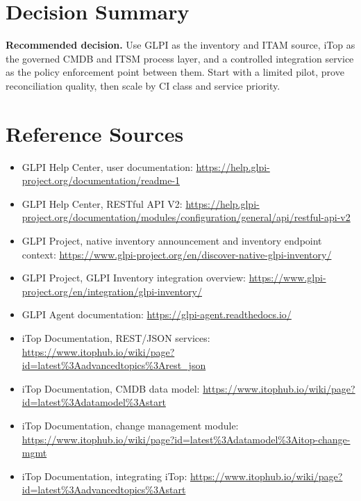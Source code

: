 \documentclass[11pt]{article}
\newcommand{\sourcesection}{%
\section*{Reference Sources}
\small
\begin{itemize}
  \item GLPI Help Center, user documentation: \url{https://help.glpi-project.org/documentation/readme-1}
  \item GLPI Help Center, RESTful API V2: \url{https://help.glpi-project.org/documentation/modules/configuration/general/api/restful-api-v2}
  \item GLPI Project, native inventory announcement and inventory endpoint context: \url{https://www.glpi-project.org/en/discover-native-glpi-inventory/}
  \item GLPI Project, GLPI Inventory integration overview: \url{https://www.glpi-project.org/en/integration/glpi-inventory/}
  \item GLPI Agent documentation: \url{https://glpi-agent.readthedocs.io/}
  \item iTop Documentation, REST/JSON services: \url{https://www.itophub.io/wiki/page?id=latest\%3Aadvancedtopics\%3Arest_json}
  \item iTop Documentation, CMDB data model: \url{https://www.itophub.io/wiki/page?id=latest\%3Adatamodel\%3Astart}
  \item iTop Documentation, change management module: \url{https://www.itophub.io/wiki/page?id=latest\%3Adatamodel\%3Aitop-change-mgmt}
  \item iTop Documentation, integrating iTop: \url{https://www.itophub.io/wiki/page?id=latest\%3Aadvancedtopics\%3Astart}
\end{itemize}
\normalsize
}
\begin{document}
\section{Decision Summary}

\begin{calloutbox}
\textbf{Recommended decision.} Use GLPI as the inventory and ITAM source, iTop as the governed CMDB and ITSM process layer, and a controlled integration service as the policy enforcement point between them. Start with a limited pilot, prove reconciliation quality, then scale by CI class and service priority.
\end{calloutbox}

\sourcesection
\end{document}
